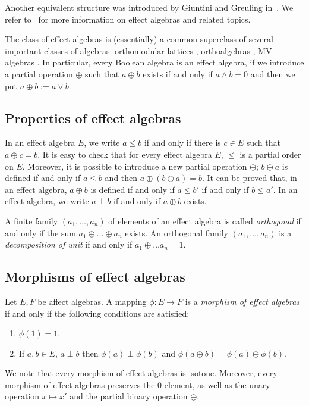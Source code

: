\documentclass[letterpaper]{amsart}
\theoremstyle{definition}
\begin{document}
Another equivalent structure was introduced by Giuntini and
Greuling in~\cite{GiuGre:TaFLfUP}. We refer to~\cite{DvuPul:NTiQS} for more
information on effect algebras and related topics.

The class of effect algebras is (essentially) 
a common superclass of several important classes of algebras: orthomodular lattices
\cite{Kal:OL,Ber:OLaAA}, orthoalgebras \cite{FouRan:OS1BC}, MV-algebras \cite{Cha:AAoMVL,Mun:IoAFCSAiLSC}. 
In particular, every Boolean algebra is an effect algebra, if we introduce a
partial operation $\oplus$ such that $a\oplus b$ exists if and only if $a\wedge b=0$ and then
we put $a\oplus b:=a\vee b$.

\subsection{Properties of effect algebras}

In an effect algebra $E$, we write $a\leq b$ if and only if there is
$c\in E$ such that $a\oplus c=b$.  It is easy to check that for every effect
algebra $E$, $\leq$ is a partial order on $E$.  Moreover, it is possible to introduce
a new partial operation $\ominus$; $b\ominus a$ is defined if and only if $a\leq
b$ and then $a\oplus(b\ominus a)=b$.  It can be proved that, in an effect
algebra, $a\oplus b$ is defined if and only if $a\leq b'$ if and only if $b\leq
a'$. In an effect algebra, we write $a\perp b$ if and only if $a\oplus b$ exists.

A finite family $(a_1,\dots,a_n)$ of elements of an effect algebra is called
{\em orthogonal} if and only if the sum $a_1\oplus\dots\oplus a_n$ exists. An orthogonal
family $(a_1,\dots,a_n)$ is a {\em decomposition of unit} if and only if $a_1\oplus\dots a_n=1$.


\subsection{Morphisms of effect algebras}

Let $E,F$ be affect algebras. A mapping $\phi:E\to F$ is a {\em morphism of effect algebras}
if and only if the following conditions are satisfied:
\begin{enumerate}
\item[(EM1)]$\phi(1)=1$.
\item[(EM2)]If $a,b\in E$, $a\perp b$ then $\phi(a)\perp\phi(b)$ and $\phi(a\oplus b)=\phi(a)\oplus\phi(b)$.
\end{enumerate}
We note that every morphism of effect algebras is isotone. Moreover, every 
morphism of effect algebras preserves the $0$ element, as well as the unary operation $x\mapsto x'$ and the partial binary operation $\ominus$.
\end{document}
